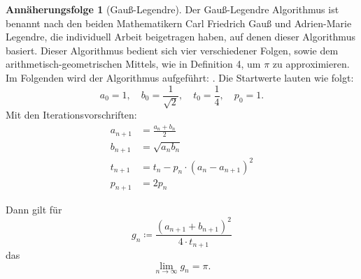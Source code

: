 \documentclass{scrartcl}
\theoremstyle{definition}
\newtheorem{approximation sequence}{Annäherungsfolge}
\begin{document}
\begin{approximation sequence}[Gauß-Legendre]

Der Gauß-Legendre Algorithmus ist benannt nach den beiden Mathematikern Carl
Friedrich Gauß und Adrien-Marie Legendre, die individuell Arbeit beigetragen
haben, auf denen dieser Algorithmus basiert. Dieser Algorithmus bedient sich
vier verschiedener Folgen, sowie dem arithmetisch-geometrischen Mittels, wie in
Definition 4, um \(\pi\) zu approximieren. Im Folgenden wird der Algorithmus
aufgeführt: \cite{AGM-Gauß-Legendre}. Die Startwerte lauten wie folgt:
\begin{equation*}
    a_0 = 1, \quad b_0 = \frac{1}{\sqrt{2}}, \quad t_0 = \frac{1}{4}, \quad p_0 = 1.
\end{equation*}
Mit den Iterationsvorschriften:
\begin{align*}
    a_{n+1} & = \frac{a_n + b_n}{2}                 \\
    b_{n+1} & = \sqrt{a_n b_n}                      \\
    t_{n+1} & = t_n - p_n \cdot {(a_n - a_{n+1})}^2 \\
    p_{n+1} & = 2 p_n
\end{align*}

Dann gilt für
\begin{equation*}
    g_n \coloneq \frac{{(a_{n+1} + b_{n+1})}^2}{4 \cdot t_{n+1}}
\end{equation*}
das
\begin{equation*}
    \lim_{n \to \infty} g_n = \pi.
\end{equation*}


\end{approximation sequence}
\end{document}
